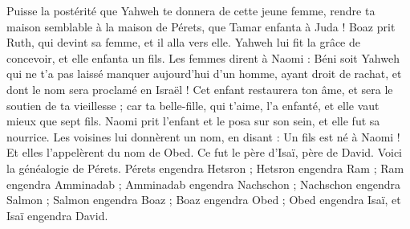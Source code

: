 \begin{multicols}{2}
Puisse la postérité que Yahweh te donnera de cette jeune femme, rendre ta maison semblable à la maison de Pérets, que Tamar enfanta à Juda !
Boaz prit Ruth, qui devint sa femme, et il alla vers elle. Yahweh lui fit la grâce de concevoir, et elle enfanta un fils.
Les femmes dirent à Naomi : Béni soit Yahweh qui ne t'a pas laissé manquer aujourd'hui d'un homme, ayant droit de rachat, et dont le nom sera proclamé en Israël !
Cet enfant restaurera ton âme, et sera le soutien de ta vieillesse ; car ta belle-fille, qui t'aime, l'a enfanté, et elle vaut mieux que sept fils.
Naomi prit l'enfant et le posa sur son sein, et elle fut sa nourrice.
Les voisines lui donnèrent un nom, en disant : Un fils est né à Naomi ! Et elles l'appelèrent du nom de Obed. Ce fut le père d'Isaï, père de David.
Voici la généalogie de Pérets. Pérets engendra Hetsron ;
Hetsron engendra Ram ; Ram engendra Amminadab ;
Amminadab engendra Nachschon ; Nachschon engendra Salmon ;
Salmon engendra Boaz ; Boaz engendra Obed ;
Obed engendra Isaï, et Isaï engendra David.
\PPE{}
\end{multicols}

